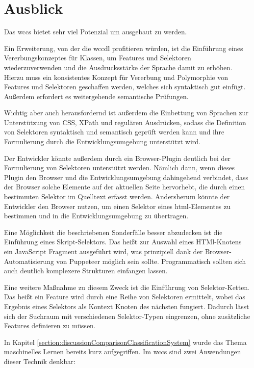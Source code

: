 \section{Ausblick}
    Das \gls{wccs} bietet sehr viel Potenzial um ausgebaut zu werden.

    Ein Erweiterung, von der die \gls{wccdl} profitieren würden,
    ist die Einführung eines Vererbungskonzeptes für Klassen,
    um Features und Selektoren wiederzuverwenden und die Ausdrucksstärke
    der Sprache damit zu erhöhen.
    Hierzu muss ein konsistentes Konzept für Vererbung und Polymorphie
    von Features und Selektoren geschaffen werden,
    welches sich syntaktisch gut einfügt.
    Außerdem erfordert es weitergehende semantische Prüfungen.

    Wichtig aber auch herausfordernd ist außerdem die Einbettung
    von Sprachen zur Unterstützung von CSS, XPath und regulären Ausdrücken,
    sodass die Definition von Selektoren syntaktisch und semantisch geprüft werden kann
    und ihre Formulierung durch die Entwicklungsumgebung unterstützt wird.

    Der Entwickler könnte außerdem durch ein Browser-Plugin
    deutlich bei der Formulierung von Selektoren unterstützt werden.
    Nämlich dann, wenn dieses Plugin den Browser und die Entwicklungsumgebung
    dahingehend verbindet, dass der Browser solche Elemente auf der aktuellen Seite
    hervorhebt, die durch einen bestimmten Selektor im Quelltext erfasst werden.
    Andersherum könnte der Entwickler den Browser nutzen,
    um einen Selektor eines \gls{html}-Elementes zu bestimmen und
    in die Entwicklungsumgebung zu übertragen.

    Eine Möglichkeit die beschriebenen Sonderfälle besser abzudecken ist die
    Einführung eines Skript-Selektors.
    Das heißt zur Auswahl eines HTMl-Knotens ein JavaScript Fragment ausgeführt wird,
    was prinzipiell dank der Browser-Automatisierung von Puppeteer möglich sein sollte.
    Programmatisch sollten sich auch deutlich komplexere Strukturen einfangen lassen.

    Eine weitere Maßnahme zu diesem Zweck ist die Einführung von Selektor-Ketten.
    Das heißt ein Feature wird durch eine Reihe von Selektoren
    ermittelt, wobei das Ergebnis eines Selektors als Kontext Knoten des nächsten fungiert.
    Dadurch lässt sich der Suchraum mit verschiedenen Selektor-Typen eingrenzen,
    ohne zusätzliche Features definieren zu müssen.

    In Kapitel \ref{section:discussionComparisonClassificationSystem}
    wurde das Thema maschinelles Lernen bereits kurz aufgegriffen.
    Im \gls{wccs} sind zwei Anwendungen dieser Technik denkbar:

